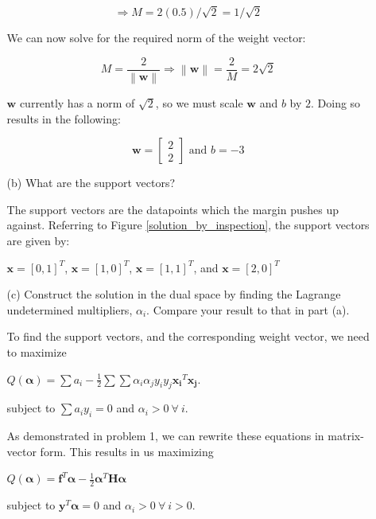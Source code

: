 \documentclass[fleqn]{article}
\newcommand{\norm}[1]{\left \lVert #1 \right \rVert}
\begin{document}
\begin{enumerate}
\begin{enumerate}
		\begin{equation*}
			\Rightarrow M = 2(0.5)/\sqrt{2} = 1/\sqrt{2} 
		\end{equation*}
		
		We can now solve for the required norm of the weight vector:
		
		\begin{equation*}
			M = \frac{2}{\norm{\mathbf{w}}} \Rightarrow \norm{\mathbf{w}} = \frac{2}{M} = 2\sqrt{2}
		\end{equation*}
		
		$\mathbf{w}$ currently has a norm of $\sqrt{2}$, so we must scale $\mathbf{w}$ and $b$ by $2$. Doing so results in the following:
		
		\begin{equation*}
			\mathbf{w} = \begin{bmatrix} 2 \\ 2 \end{bmatrix} \text{ and } b = -3
		\end{equation*}	
		
		\item[(b)] What are the support vectors?
		
		The support vectors are the datapoints which the margin pushes up against. Referring to Figure \ref{solution_by_inspection}, the support vectors are given by:
		
		$\mathbf{x} = [0, 1]^T$, $\mathbf{x} = [1, 0]^T$, $\mathbf{x} = [1, 1]^T$, and $\mathbf{x} = [2, 0]^T$
		
		\item[(c)] Construct the solution in the dual space by finding the Lagrange undetermined multipliers, $\alpha_i$. Compare your result to that in \newline part (a).
		
		To find the support vectors, and the corresponding weight vector, we need to maximize		
		
		$Q(\boldsymbol{\alpha}) = \sum{a_i} - \frac{1}{2}\sum{\sum{\alpha_i\alpha_jy_iy_j\mathbf{x_i}^T\mathbf{x_j}}}$.
	
	subject to $\sum{a_iy_i} = 0$ and $\alpha_i > 0\ \forall\ i$.
	
		As demonstrated in problem 1, we can rewrite these equations in matrix-vector form. This results in us maximizing
		
		$Q(\boldsymbol{\alpha}) = \mathbf{f}^T\boldsymbol{\alpha} - \frac{1}{2}\boldsymbol{\alpha}^T\mathbf{H}\boldsymbol{\alpha}$
		
		subject to $\mathbf{y}^T\boldsymbol{\alpha} = 0$ and $\alpha_i > 0\ \forall\ i > 0$.
		

\end{enumerate}
\end{enumerate}
\end{document}
